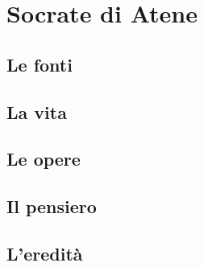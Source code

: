 \chapter{Socrate di Atene}

\section{Le fonti}

\section{La vita}

\section{Le opere}

\section{Il pensiero}

\section{L'eredità}
